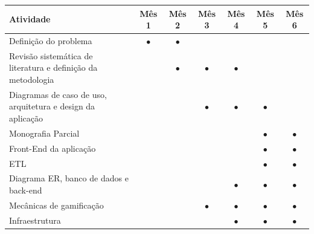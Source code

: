 \begin{quadro}[htbp]

    \centering
    \caption{\label{qua:cronograma-1-2}Cronograma de Desenvolvimento}

    \begin{tabular}{|p{6.6cm}|c|c|c|c|c|c|}

    \hline

    \textbf{Atividade} & \textbf{Mês 1} & \textbf{Mês 2} & \textbf{Mês 3} & \textbf{Mês 4} & \textbf{Mês 5} & \textbf{Mês 6} \\ \hline

    Definição do problema & $\bullet$ & $\bullet$ & & & & \\ \hline

    Revisão sistemática de literatura e definição da metodologia & & $\bullet$ & $\bullet$ & $\bullet$ & & \\ \hline

    Diagramas de caso de uso, arquitetura e design da aplicação & & & $\bullet$ & $\bullet$ & $\bullet$ & \\ \hline

    Monografia Parcial & & & & & $\bullet$ & $\bullet$ \\ \hline

    Front-End da aplicação & & & & & $\bullet$ & $\bullet$ \\ \hline

    ETL & & & & & $\bullet$ & $\bullet$ \\ \hline

    Diagrama ER, banco de dados e back-end & & & & $\bullet$ & $\bullet$ & $\bullet$ \\ \hline

    Mecânicas de gamificação & & & $\bullet$ & $\bullet$ & $\bullet$ & $\bullet$ \\ \hline

    Infraestrutura & & & & $\bullet$ & $\bullet$ & $\bullet$ \\ \hline

    \end{tabular}


\end{quadro}

